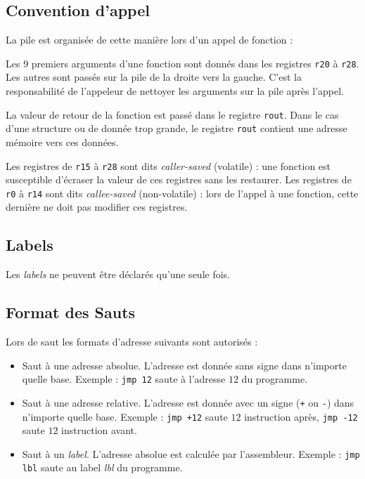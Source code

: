 \documentclass[french, 12pt]{article}
\begin{document}

\subsection*{Convention d'appel}

La pile est organisée de cette manière lors d'un appel de fonction :


Les 9 premiers arguments d'une fonction sont donnés dans les registres \texttt{r20} à \texttt{r28}.
Les autres sont passés sur la pile de la droite vers la gauche. C'est la responsabilité
de l'appeleur de nettoyer les arguments sur la pile après l'appel.

La valeur de retour de la fonction est passé dans le registre \texttt{rout}. Dans le cas
d'une structure ou de donnée trop grande, le registre \texttt{rout} contient une adresse
mémoire vers ces données.

Les registres de \texttt{r15} à \texttt{r28} sont dits \emph{caller-saved} (volatile) :
une fonction est susceptible d'écraser la valeur de ces registres sans les restaurer.
Les registres de \texttt{r0} à \texttt{r14} sont dits \emph{callee-saved} (non-volatile) :
lors de l'appel à une fonction, cette dernière ne doit pas modifier ces registres.

\subsection*{Labels}

Les \emph{labels} ne peuvent être déclarés qu'une seule fois.

\subsection*{Format des Sauts}

Lors de saut les formats d'adresse suivants sont autorisés :
\begin{itemize}
      \item Saut à une adresse absolue. L'adresse est donnée sans signe dans
            n'importe quelle base. Exemple : \verb|jmp 12| saute à l'adresse $12$ du programme.
      \item Saut à une adresse relative. L'adresse est donnée avec un signe
            (\texttt{+} ou \texttt{-}) dans n'importe quelle base. Exemple :
            \verb|jmp +12| saute $12$ instruction après, \verb|jmp -12| saute
            $12$ instruction avant.
      \item Saut à un \emph{label}. L'adresse absolue est calculée par
            l'assembleur. Exemple : \verb|jmp lbl| saute au label \emph{lbl} du
            programme.
\end{itemize}
\end{document}
